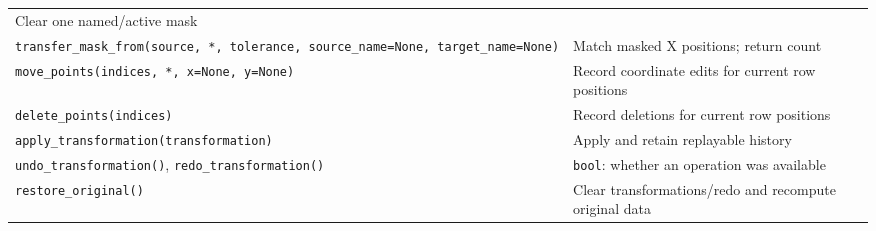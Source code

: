 \documentclass[
  10pt,
  a4paper,
  oneside]{scrreprt}
\begin{document}
\begin{longtable}[]{@{}ll@{}}
\begin{minipage}[t]{0.47\columnwidth}
Clear one named/active mask\strut
\end{minipage}\tabularnewline
\begin{minipage}[t]{0.47\columnwidth}\raggedright
\texttt{transfer\_mask\_from(source,\ *,\ tolerance,\ source\_name=None,\ target\_name=None)}\strut
\end{minipage} & \begin{minipage}[t]{0.47\columnwidth}\raggedright
Match masked X positions; return count\strut
\end{minipage}\tabularnewline
\begin{minipage}[t]{0.47\columnwidth}\raggedright
\texttt{move\_points(indices,\ *,\ x=None,\ y=None)}\strut
\end{minipage} & \begin{minipage}[t]{0.47\columnwidth}\raggedright
Record coordinate edits for current row positions\strut
\end{minipage}\tabularnewline
\begin{minipage}[t]{0.47\columnwidth}\raggedright
\texttt{delete\_points(indices)}\strut
\end{minipage} & \begin{minipage}[t]{0.47\columnwidth}\raggedright
Record deletions for current row positions\strut
\end{minipage}\tabularnewline
\begin{minipage}[t]{0.47\columnwidth}\raggedright
\texttt{apply\_transformation(transformation)}\strut
\end{minipage} & \begin{minipage}[t]{0.47\columnwidth}\raggedright
Apply and retain replayable history\strut
\end{minipage}\tabularnewline
\begin{minipage}[t]{0.47\columnwidth}\raggedright
\texttt{undo\_transformation()}, \texttt{redo\_transformation()}\strut
\end{minipage} & \begin{minipage}[t]{0.47\columnwidth}\raggedright
\texttt{bool}: whether an operation was available\strut
\end{minipage}\tabularnewline
\begin{minipage}[t]{0.47\columnwidth}\raggedright
\texttt{restore\_original()}\strut
\end{minipage} & \begin{minipage}[t]{0.47\columnwidth}\raggedright
Clear transformations/redo and recompute original data\strut
\end{minipage}\tabularnewline

\end{longtable}
\end{document}
